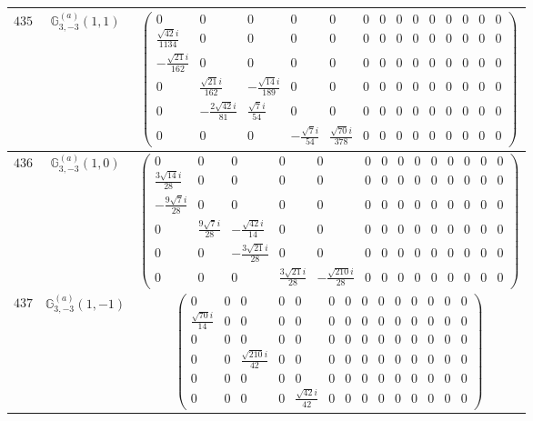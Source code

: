 \documentclass[fleqn,8pt,landscape]{jsarticle}
\begin{document}
\begin{center}
\begin{longtable}{ccc}
$ 435 $ & $ \mathbb{G}_{3,-3}^{(a)}(1,1) $ & $ \begin{pmatrix} 0 & 0 & 0 & 0 & 0 & 0 & 0 & 0 & 0 & 0 & 0 & 0 & 0 & 0 \\ \frac{\sqrt{42} i}{1134} & 0 & 0 & 0 & 0 & 0 & 0 & 0 & 0 & 0 & 0 & 0 & 0 & 0 \\ - \frac{\sqrt{21} i}{162} & 0 & 0 & 0 & 0 & 0 & 0 & 0 & 0 & 0 & 0 & 0 & 0 & 0 \\ 0 & \frac{\sqrt{21} i}{162} & - \frac{\sqrt{14} i}{189} & 0 & 0 & 0 & 0 & 0 & 0 & 0 & 0 & 0 & 0 & 0 \\ 0 & - \frac{2 \sqrt{42} i}{81} & \frac{\sqrt{7} i}{54} & 0 & 0 & 0 & 0 & 0 & 0 & 0 & 0 & 0 & 0 & 0 \\ 0 & 0 & 0 & - \frac{\sqrt{7} i}{54} & \frac{\sqrt{70} i}{378} & 0 & 0 & 0 & 0 & 0 & 0 & 0 & 0 & 0 \end{pmatrix} $ \\ \hline
$ 436 $ & $ \mathbb{G}_{3,-3}^{(a)}(1,0) $ & $ \begin{pmatrix} 0 & 0 & 0 & 0 & 0 & 0 & 0 & 0 & 0 & 0 & 0 & 0 & 0 & 0 \\ \frac{3 \sqrt{14} i}{28} & 0 & 0 & 0 & 0 & 0 & 0 & 0 & 0 & 0 & 0 & 0 & 0 & 0 \\ - \frac{9 \sqrt{7} i}{28} & 0 & 0 & 0 & 0 & 0 & 0 & 0 & 0 & 0 & 0 & 0 & 0 & 0 \\ 0 & \frac{9 \sqrt{7} i}{28} & - \frac{\sqrt{42} i}{14} & 0 & 0 & 0 & 0 & 0 & 0 & 0 & 0 & 0 & 0 & 0 \\ 0 & 0 & - \frac{3 \sqrt{21} i}{28} & 0 & 0 & 0 & 0 & 0 & 0 & 0 & 0 & 0 & 0 & 0 \\ 0 & 0 & 0 & \frac{3 \sqrt{21} i}{28} & - \frac{\sqrt{210} i}{28} & 0 & 0 & 0 & 0 & 0 & 0 & 0 & 0 & 0 \end{pmatrix} $ \\ \hline
$ 437 $ & $ \mathbb{G}_{3,-3}^{(a)}(1,-1) $ & $ \begin{pmatrix} 0 & 0 & 0 & 0 & 0 & 0 & 0 & 0 & 0 & 0 & 0 & 0 & 0 & 0 \\ \frac{\sqrt{70} i}{14} & 0 & 0 & 0 & 0 & 0 & 0 & 0 & 0 & 0 & 0 & 0 & 0 & 0 \\ 0 & 0 & 0 & 0 & 0 & 0 & 0 & 0 & 0 & 0 & 0 & 0 & 0 & 0 \\ 0 & 0 & \frac{\sqrt{210} i}{42} & 0 & 0 & 0 & 0 & 0 & 0 & 0 & 0 & 0 & 0 & 0 \\ 0 & 0 & 0 & 0 & 0 & 0 & 0 & 0 & 0 & 0 & 0 & 0 & 0 & 0 \\ 0 & 0 & 0 & 0 & \frac{\sqrt{42} i}{42} & 0 & 0 & 0 & 0 & 0 & 0 & 0 & 0 & 0 \end{pmatrix} $ \\ \hline

\end{longtable}
\end{center}
\end{document}
